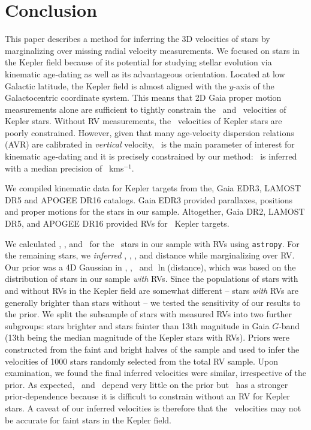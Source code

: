 \section{Conclusion}

This paper describes a method for inferring the 3D velocities of stars by
marginalizing over missing radial velocity measurements.
We focused on stars in the Kepler field because of its potential for studying
stellar evolution via kinematic age-dating as well as its advantageous
orientation.
Located at low Galactic latitude, the Kepler field is almost aligned with the
$y$-axis of the Galactocentric coordinate system.
This means that 2D Gaia proper motion measurements alone are sufficient to
tightly constrain the \vx\ and \vz\ velocities of Kepler stars.
Without RV measurements, the \vy\ velocities  of Kepler stars are
poorly constrained.
However, given that many age-velocity dispersion relations (AVR) are
calibrated in {\it vertical} velocity, \vz\ is the main parameter of interest
for kinematic age-dating and it is precisely constrained by our method: \vz\
is inferred with a median precision of \vzprecision\ kms$^{-1}$.

We compiled kinematic data for Kepler targets from the, Gaia EDR3, LAMOST DR5
and APOGEE DR16 catalogs.
Gaia EDR3 provided parallaxes, positions and proper motions for the stars in
our sample.
Altogether, Gaia DR2, LAMOST DR5, and APOGEE DR16 provided RVs for \nrv\
Kepler targets.

We calculated \vx, \vy, and \vz\ for the \nrv\ stars in our sample with RVs
using {\tt astropy}.
For the remaining stars, we {\it inferred} \vx, \vy, \vz, and distance while
marginalizing over RV.
Our prior was a 4D Gaussian in \vx, \vy, \vz\ and $\ln$(distance), which was
based on the distribution of stars in our sample {\it with} RVs.
Since the populations of stars with and without RVs in the Kepler field are
somewhat different -- stars {\it with} RVs are generally brighter than stars
without -- we tested the sensitivity of our results to the prior.
We split the subsample of stars with measured RVs into two further subgroups:
stars brighter and stars fainter than 13th magnitude in Gaia $G$-band (13th
being the median magnitude of the Kepler stars with RVs).
Priors were constructed from the faint and bright halves of the sample and
used to infer the velocities of 1000 stars randomly selected from the total RV
sample.
Upon examination, we found the final inferred velocities were similar,
irrespective of the prior.
As expected, \vx\ and \vz\ depend very little on the prior but \vy\ has a
stronger prior-dependence because it is difficult to constrain without an RV
for Kepler stars.
A caveat of our inferred velocities is therefore that the \vy\ velocities may
not be accurate for faint stars in the Kepler field.

